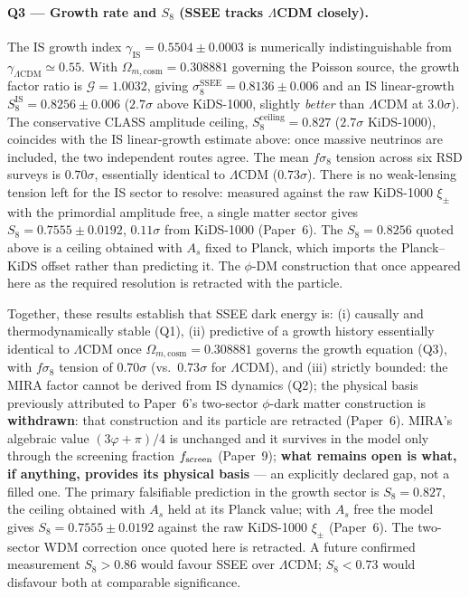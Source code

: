 \documentclass[12pt,a4paper]{article}
\begin{document}
\paragraph{Q3 — Growth rate and $S_8$ (SSEE tracks $\Lambda$CDM closely).}
The IS growth index $\gamma_{\mathrm{IS}} = 0.5504 \pm 0.0003$
is numerically indistinguishable from $\gamma_{\Lambda\mathrm{CDM}} \simeq 0.55$.
With $\Omega_{m,\mathrm{cosm}} = 0.308881$ governing the Poisson source,
the growth factor ratio is $\mathcal{G} = 1.0032$, giving
$\sigma_8^{\mathrm{SSEE}} = 0.8136 \pm 0.006$ and an IS linear-growth
$S_8^{\mathrm{IS}} = 0.8256 \pm 0.006$ ($2.7\sigma$ above KiDS-1000, slightly
\emph{better} than $\Lambda$CDM at $3.0\sigma$).
The conservative CLASS amplitude ceiling, $S_8^{\mathrm{ceiling}} = 0.827$
($2.7\sigma$ KiDS-1000), coincides with the IS linear-growth estimate above:
once massive neutrinos are included, the two independent routes agree.
The mean $f\sigma_8$ tension across six RSD surveys is $0.70\sigma$,
essentially identical to $\Lambda$CDM ($0.73\sigma$).
There is no weak-lensing tension left for the IS sector to resolve: measured
against the raw KiDS-1000 $\xi_\pm$ with the primordial amplitude free, a single
matter sector gives $S_8 = 0.7555\pm0.0192$, $0.11\sigma$ from KiDS-1000
(Paper~6).  The $S_8 = 0.8256$ quoted above is a ceiling obtained with $A_s$
fixed to Planck, which imports the Planck--KiDS offset rather than predicting
it.  The $\phi$-DM construction that once appeared here as the required
resolution is retracted with the particle.

Together, these results establish that SSEE dark energy is:
(i) causally and thermodynamically stable (Q1),
(ii) predictive of a growth history essentially identical to $\Lambda$CDM
    once $\Omega_{m,\mathrm{cosm}}=0.308881$ governs the growth equation (Q3),
    with $f\sigma_8$ tension of $0.70\sigma$ (vs.\ $0.73\sigma$ for $\Lambda$CDM), and
(iii) strictly bounded: the MIRA factor cannot be derived from IS dynamics (Q2); the physical basis previously attributed to Paper~6's two-sector $\phi$-dark matter construction is \textbf{withdrawn}: that construction and its particle are retracted (Paper~6). MIRA's algebraic value $(3\varphi+\pi)/4$ is unchanged and it survives in the model only through the screening fraction $f_{\rm screen}$ (Paper~9); \textbf{what remains open is what, if anything, provides its physical basis} --- an explicitly declared gap, not a filled one.
The primary falsifiable prediction in the growth sector is
$S_8 = 0.827$, the ceiling obtained with $A_s$ held at its Planck value; with
$A_s$ free the model gives $S_8 = 0.7555\pm0.0192$ against the raw KiDS-1000
$\xi_\pm$ (Paper~6). The two-sector WDM correction once quoted here is
retracted.
A future confirmed measurement $S_8 > 0.86$ would favour SSEE over $\Lambda$CDM;
$S_8 < 0.73$ would disfavour both at comparable significance.
\end{document}
